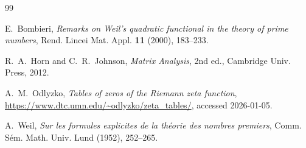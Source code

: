 \documentclass[12pt,reqno]{amsart}
\numberwithin{equation}{section}
\theoremstyle{definition}
\theoremstyle{remark}
\begin{document}
\begin{thebibliography}{99}

E.~Bombieri,
\emph{Remarks on Weil's quadratic functional in the theory of prime numbers},
Rend. Lincei Mat. Appl. \textbf{11} (2000), 183--233.

R.~A.~Horn and C.~R.~Johnson,
\emph{Matrix Analysis}, 2nd ed., Cambridge Univ. Press, 2012.

A.~M.~Odlyzko,
\emph{Tables of zeros of the Riemann zeta function},
\url{https://www.dtc.umn.edu/~odlyzko/zeta_tables/}, accessed 2026-01-05.

A.~Weil,
\emph{Sur les formules explicites de la théorie des nombres premiers},
Comm. Sém. Math. Univ. Lund (1952), 252--265.

\end{thebibliography}
\end{document}
